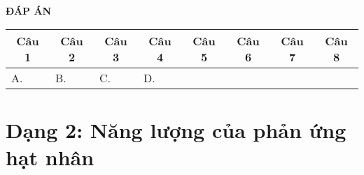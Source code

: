 \textbf{ĐÁP ÁN}
\begin{longtable}[\textwidth]{|p{}|p{}|p{}|p{}|p{}|p{}|p{}|p{}|}
	\hline%
	\multicolumn{1}{|c|}{\textbf{Câu 1}} & \multicolumn{1}{c|}{\textbf{Câu 2}} & \multicolumn{1}{c|}{\textbf{Câu 3}} &
	\multicolumn{1}{c|}{\textbf{Câu 4}} &
	\multicolumn{1}{c|}{\textbf{Câu 5}} &
	\multicolumn{1}{c|}{\textbf{Câu 6}} &
	\multicolumn{1}{c|}{\textbf{Câu 7}} &
	\multicolumn{1}{c|}{\textbf{Câu 8}} \\
	\hline
	A.&B. &C. &D. & & & &\\
	\hline
	
	
\end{longtable} 
\section{Dạng 2: Năng lượng của phản ứng hạt nhân}
